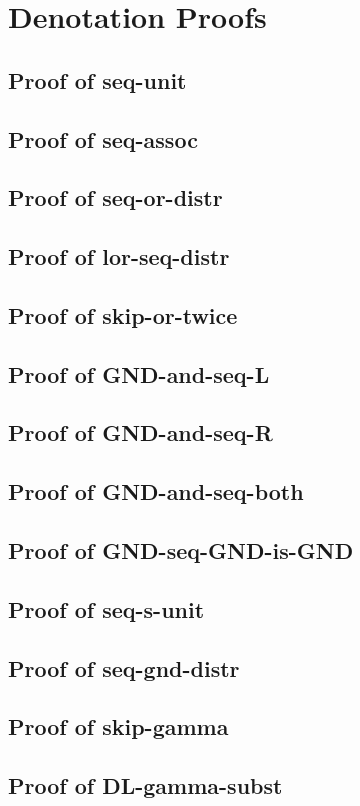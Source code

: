 \section{Denotation Proofs}\label{sec:denote-proofs}


\subsection{Proof of seq-unit}
\subsection{Proof of seq-assoc}
\subsection{Proof of seq-or-distr}
\subsection{Proof of lor-seq-distr}
\subsection{Proof of skip-or-twice}
\subsection{Proof of GND-and-seq-L}
\subsection{Proof of GND-and-seq-R}
\subsection{Proof of GND-and-seq-both}
\subsection{Proof of GND-seq-GND-is-GND}
\subsection{Proof of seq-s-unit}
\subsection{Proof of seq-gnd-distr}
\subsection{Proof of skip-gamma}
\subsection{Proof of DL-gamma-subst}
